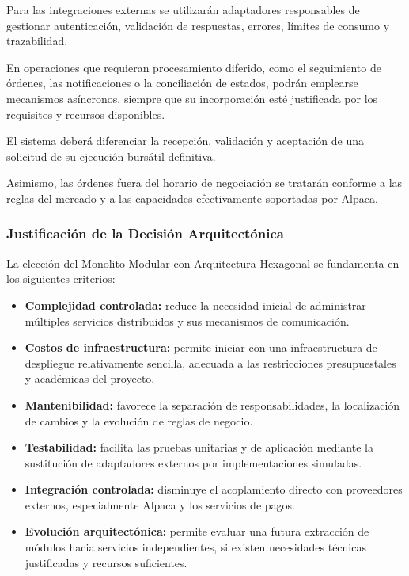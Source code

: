 \documentclass[11pt,a4paper,oneside]{article}
\begin{document}
Para las integraciones externas se utilizarán
adaptadores responsables de gestionar
autenticación, validación de respuestas,
errores, límites de consumo y trazabilidad.

En operaciones que requieran procesamiento
diferido, como el seguimiento de órdenes,
las notificaciones o la conciliación de estados,
podrán emplearse mecanismos asíncronos,
siempre que su incorporación esté justificada
por los requisitos y recursos disponibles.

El sistema deberá diferenciar la recepción,
validación y aceptación de una solicitud
de su ejecución bursátil definitiva.

Asimismo, las órdenes fuera del horario
de negociación se tratarán conforme
a las reglas del mercado y a las
capacidades efectivamente soportadas
por Alpaca.

\subsubsection{Justificación de la Decisión Arquitectónica}

La elección del Monolito Modular con
Arquitectura Hexagonal se fundamenta
en los siguientes criterios:

\begin{itemize}

    \item \textbf{Complejidad controlada:}
    reduce la necesidad inicial de administrar
    múltiples servicios distribuidos y sus
    mecanismos de comunicación.

    \item \textbf{Costos de infraestructura:}
    permite iniciar con una infraestructura
    de despliegue relativamente sencilla,
    adecuada a las restricciones presupuestales
    y académicas del proyecto.

    \item \textbf{Mantenibilidad:}
    favorece la separación de responsabilidades,
    la localización de cambios y la evolución
    de reglas de negocio.

    \item \textbf{Testabilidad:}
    facilita las pruebas unitarias y de aplicación
    mediante la sustitución de adaptadores externos
    por implementaciones simuladas.

    \item \textbf{Integración controlada:}
    disminuye el acoplamiento directo
    con proveedores externos, especialmente
    Alpaca y los servicios de pagos.

    \item \textbf{Evolución arquitectónica:}
    permite evaluar una futura extracción
    de módulos hacia servicios independientes,
    si existen necesidades técnicas
    justificadas y recursos suficientes.

\end{itemize}
\end{document}
